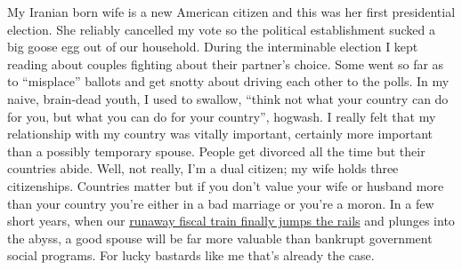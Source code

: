 My Iranian born wife is a new American citizen and this was her first
presidential election. She reliably cancelled my vote so the political
establishment sucked a big goose egg out of our household. During the
interminable election I kept reading about couples fighting about their
partner's choice. Some went so far as to ``misplace'' ballots and get
snotty about driving each other to the polls. In my naive, brain-dead
youth, I used to swallow, ``think not what your country can do for you,
but what you can do for your country'', hogwash. I really felt that my
relationship with my country was vitally important, certainly more
important than a possibly temporary spouse. People get divorced all the
time but their countries abide. Well, not really, I'm a dual citizen; my
wife holds three citizenships. Countries matter but if you don't value
your wife or husband more than your country you're either in a bad
marriage or you're a moron. In a few short years, when our
\href{http://www.hangthebankers.com/economic-collapse-is-inevitable-heres-why/}{runaway
fiscal train finally jumps the rails} and plunges into the abyss, a good
spouse will be far more valuable than bankrupt government social
programs. For lucky bastards like me that's already the case.



%
